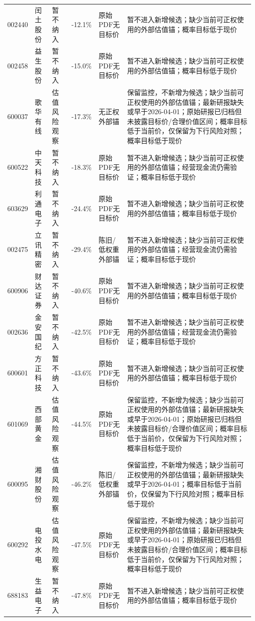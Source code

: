 \begin{longtable}{L{1.0cm}L{1.55cm}L{2.1cm}R{1.0cm}L{2.4cm}L{5.3cm}}
002440 & 闰土股份 & 暂不纳入 & -12.1\% & 原始PDF无目标价 & 暂不进入新增候选；缺少当前可正权使用的外部估值锚；概率目标低于现价 \\
002458 & 益生股份 & 暂不纳入 & -15.0\% & 原始PDF无目标价 & 暂不进入新增候选；缺少当前可正权使用的外部估值锚；概率目标低于现价 \\
600037 & 歌华有线 & 估值风险观察 & -17.3\% & 无正权外部锚 & 保留监控，不新增为候选；缺少当前可正权使用的外部估值锚；最新研报缺失或早于2026-04-01；原始研报已归档但未披露目标价/合理价值区间；概率目标低于当前价，仅保留为下行风险对照；概率目标低于现价 \\
600522 & 中天科技 & 暂不纳入 & -18.3\% & 原始PDF无目标价 & 暂不进入新增候选；缺少当前可正权使用的外部估值锚；经营现金流仍需验证；概率目标低于现价 \\
603629 & 利通电子 & 暂不纳入 & -24.4\% & 原始PDF无目标价 & 暂不进入新增候选；缺少当前可正权使用的外部估值锚；概率目标低于现价 \\
002475 & 立讯精密 & 暂不纳入 & -29.4\% & 陈旧/低权重外部锚 & 暂不进入新增候选；缺少当前可正权使用的外部估值锚；经营现金流仍需验证；概率目标低于现价 \\
600906 & 财达证券 & 暂不纳入 & -40.6\% & 原始PDF无目标价 & 暂不进入新增候选；缺少当前可正权使用的外部估值锚；概率目标低于现价 \\
002636 & 金安国纪 & 暂不纳入 & -42.5\% & 原始PDF无目标价 & 暂不进入新增候选；缺少当前可正权使用的外部估值锚；经营现金流仍需验证；概率目标低于现价 \\
600601 & 方正科技 & 暂不纳入 & -43.6\% & 原始PDF无目标价 & 暂不进入新增候选；缺少当前可正权使用的外部估值锚；概率目标低于现价 \\
601069 & 西部黄金 & 估值风险观察 & -44.5\% & 原始PDF无目标价 & 保留监控，不新增为候选；缺少当前可正权使用的外部估值锚；最新研报缺失或早于2026-04-01；原始研报已归档但未披露目标价/合理价值区间；概率目标低于当前价，仅保留为下行风险对照；概率目标低于现价 \\
600095 & 湘财股份 & 估值风险观察 & -46.2\% & 陈旧/低权重外部锚 & 保留监控，不新增为候选；缺少当前可正权使用的外部估值锚；最新研报缺失或早于2026-04-01；概率目标低于当前价，仅保留为下行风险对照；概率目标低于现价 \\
600292 & 电投水电 & 估值风险观察 & -47.5\% & 原始PDF无目标价 & 保留监控，不新增为候选；缺少当前可正权使用的外部估值锚；最新研报缺失或早于2026-04-01；原始研报已归档但未披露目标价/合理价值区间；概率目标低于当前价，仅保留为下行风险对照；概率目标低于现价 \\
688183 & 生益电子 & 暂不纳入 & -47.8\% & 原始PDF无目标价 & 暂不进入新增候选；缺少当前可正权使用的外部估值锚；概率目标低于现价 \\

\end{longtable}
